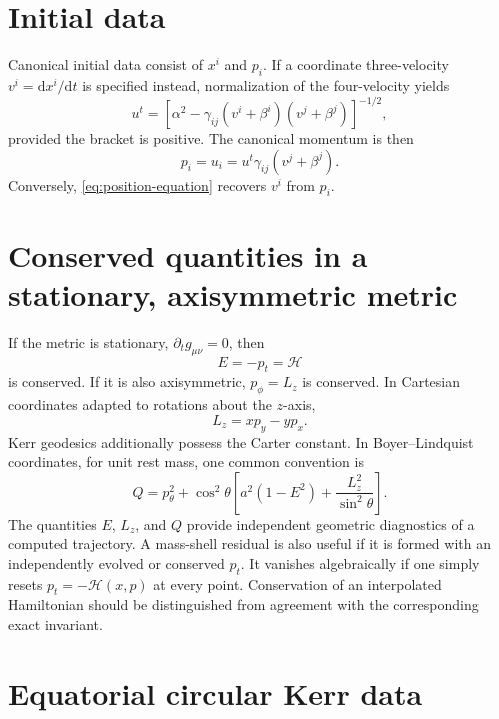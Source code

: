 \documentclass[11pt]{article}
\newcommand{\dd}{\mathrm{d}}
\newcommand{\Ham}{\mathcal{H}}
\begin{document}
\section{Initial data}

Canonical initial data consist of \(x^i\) and \(p_i\).  If a coordinate
three-velocity \(v^i=\dd x^i/\dd t\) is specified instead, normalization of
the four-velocity yields
\begin{equation}
 u^t=
 \left[\alpha^2-
 \gamma_{ij}(v^i+\beta^i)(v^j+\beta^j)\right]^{-1/2},
 \label{eq:ut-from-velocity}
\end{equation}
provided the bracket is positive.  The canonical momentum is then
\begin{equation}
 p_i=u_i=u^t\gamma_{ij}(v^j+\beta^j).
 \label{eq:momentum-from-velocity}
\end{equation}
Conversely,
\cref{eq:position-equation} recovers \(v^i\) from \(p_i\).

\section{Conserved quantities in a stationary, axisymmetric metric}

If the metric is stationary, \(\partial_t g_{\mu\nu}=0\), then
\begin{equation}
 E=-p_t=\Ham
 \label{eq:energy}
\end{equation}
is conserved.  If it is also axisymmetric, \(p_\phi=L_z\) is conserved.  In
Cartesian coordinates adapted to rotations about the \(z\)-axis,
\begin{equation}
 L_z=x p_y-y p_x.
 \label{eq:angular-momentum}
\end{equation}
Kerr geodesics additionally possess the Carter constant.  In
Boyer--Lindquist coordinates, for unit rest mass, one common convention is
\begin{equation}
 Q=p_\theta^2+\cos^2\theta
 \left[a^2(1-E^2)+\frac{L_z^2}{\sin^2\theta}\right].
 \label{eq:carter}
\end{equation}
The quantities \(E\), \(L_z\), and \(Q\) provide independent geometric
diagnostics of a computed trajectory.  A mass-shell residual is also useful
if it is formed with an independently evolved or conserved \(p_t\).  It
vanishes algebraically if one simply resets \(p_t=-\Ham(x,p)\) at every point.
Conservation of an interpolated Hamiltonian should be distinguished from
agreement with the corresponding exact invariant.

\section{Equatorial circular Kerr data}
\end{document}
